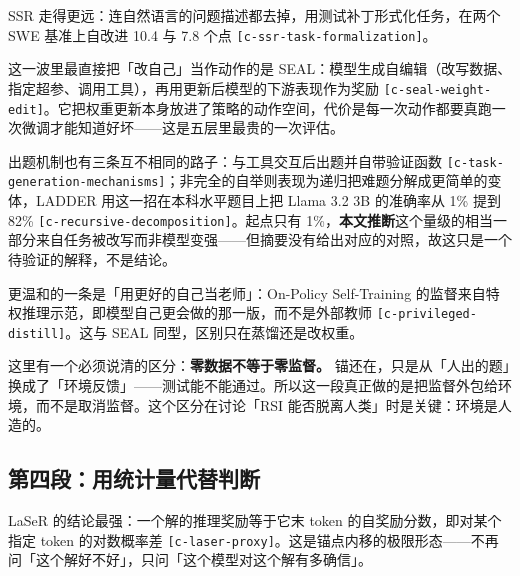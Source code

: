 SSR 走得更远：连自然语言的问题描述都去掉，用测试补丁形式化任务，在两个 SWE 基准上自改进 10.4 与 7.8 个点 {\scriptsize\texttt{[c-\hspace{0pt}ssr-\hspace{0pt}task-\hspace{0pt}formalization]}}。


这一波里最直接把「改自己」当作动作的是 SEAL：模型生成自编辑（改写数据、指定超参、调用工具），再用更新后模型的下游表现作为奖励 {\scriptsize\texttt{[c-\hspace{0pt}seal-\hspace{0pt}weight-\hspace{0pt}edit]}}。它把权重更新本身放进了策略的动作空间，代价是每一次动作都要真跑一次微调才能知道好坏——这是五层里最贵的一次评估。


出题机制也有三条互不相同的路子：与工具交互后出题并自带验证函数 {\scriptsize\texttt{[c-\hspace{0pt}task-\hspace{0pt}generation-\hspace{0pt}mechanisms]}}；非完全的自举则表现为递归把难题分解成更简单的变体，LADDER 用这一招在本科水平题目上把 Llama 3.2 3B 的准确率从 1\% 提到 82\% {\scriptsize\texttt{[c-\hspace{0pt}recursive-\hspace{0pt}decomposition]}}。起点只有 1\%，\textbf{本文推断}这个量级的相当一部分来自任务被改写而非模型变强——但摘要没有给出对应的对照，故这只是一个待验证的解释，不是结论。


更温和的一条是「用更好的自己当老师」：On-Policy Self-Training 的监督来自特权推理示范，即模型自己更会做的那一版，而不是外部教师 {\scriptsize\texttt{[c-\hspace{0pt}privileged-\hspace{0pt}distill]}}。这与 SEAL 同型，区别只在蒸馏还是改权重。


这里有一个必须说清的区分：\textbf{零数据不等于零监督。} 锚还在，只是从「人出的题」换成了「环境反馈」——测试能不能通过。所以这一段真正做的是把监督外包给环境，而不是取消监督。这个区分在讨论「RSI 能否脱离人类」时是关键：环境是人造的。


\subsection{第四段：用统计量代替判断}

LaSeR 的结论最强：一个解的推理奖励等于它末 token 的自奖励分数，即对某个指定 token 的对数概率差 {\scriptsize\texttt{[c-\hspace{0pt}laser-\hspace{0pt}proxy]}}。这是锚点内移的极限形态——不再问「这个解好不好」，只问「这个模型对这个解有多确信」。


